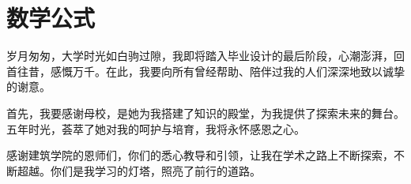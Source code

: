 \documentclass[AutoFakeBold]{ZafuThesis}
\begin{document}
\section{数学公式}




\clearpage
% 
% 

% 

\Thanks
{
  岁月匆匆，大学时光如白驹过隙，我即将踏入毕业设计的最后阶段，心潮澎湃，回首往昔，感慨万千。在此，我要向所有曾经帮助、陪伴过我的人们深深地致以诚挚的谢意。\par
  首先，我要感谢母校，是她为我搭建了知识的殿堂，为我提供了探索未来的舞台。五年时光，荟萃了她对我的呵护与培育，我将永怀感恩之心。\par
  感谢建筑学院的恩师们，你们的悉心教导和引领，让我在学术之路上不断探索，不断超越。你们是我学习的灯塔，照亮了前行的道路。
}
\end{document}
